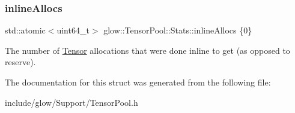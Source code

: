 \subsubsection{\texorpdfstring{inline\+Allocs}{inlineAllocs}}
{\footnotesize\ttfamily std\+::atomic$<$uint64\+\_\+t$>$ glow\+::\+Tensor\+Pool\+::\+Stats\+::inline\+Allocs \{0\}}

The number of \hyperlink{classglow_1_1_tensor}{Tensor} allocations that were done inline to get (as opposed to reserve). 

The documentation for this struct was generated from the following file\+:\begin{DoxyCompactItemize}
\item 
include/glow/\+Support/Tensor\+Pool.\+h\end{DoxyCompactItemize}
